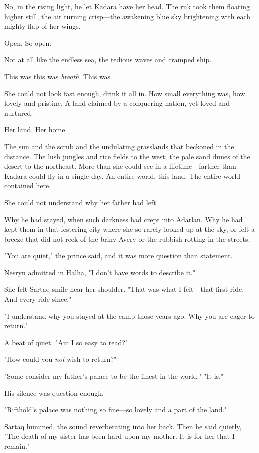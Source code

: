 No, in the rising light, he let Kadara have her head. The ruk took them floating higher still, the air turning crisp---the awakening blue sky brightening with each mighty flap of her wings.

Open. So open.

Not at all like the endless sea, the tedious waves and cramped ship.

This was  this was \emph{breath}. This was 

She could not look fast enough, drink it all in. How small everything was, how lovely and pristine. A land claimed by a conquering nation, yet loved and nurtured.

Her land. Her home.

The sun and the scrub and the undulating grasslands that beckoned in the distance. The lush jungles and rice fields to the west; the pale sand dunes of the desert to the northeast. More than she could see in a lifetime---farther than Kadara could fly in a single day. An entire world, this land. The entire world contained here.

She could not understand why her father had left.

Why he had stayed, when such darkness had crept into Adarlan. Why he had kept them in that festering city where she so rarely looked up at the sky, or felt a breeze that did not reek of the briny Avery or the rubbish rotting in the streets.

"You are quiet," the prince said, and it was more question than statement.

Nesryn admitted in Halha, "I don't have words to describe it."

She felt Sartaq smile near her shoulder. "That was what I felt---that first ride. And every ride since."

"I understand why you stayed at the camp those years ago. Why you are eager to return."

A beat of quiet. "Am I so easy to read?"

"How could you \emph{not} wish to return?"

"Some consider my father's palace to be the finest in the world." "It is."

His silence was question enough.

"Rifthold's palace was nothing so fine---so lovely and a part of the land."

Sartaq hummed, the sound reverberating into her back. Then he said quietly, "The death of my sister has been hard upon my mother. It is for her that I remain."

